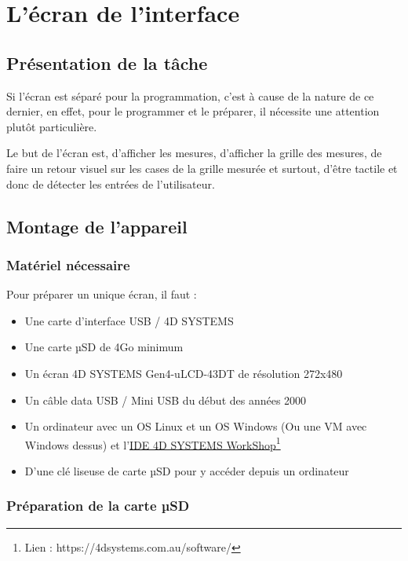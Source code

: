 \documentclass[11pt]{article}
\begin{document}
\newpage

\section{L'écran de l'interface}

\subsection{Présentation de la tâche}

Si l'écran est séparé pour la programmation, c'est à cause de la nature de ce dernier, en effet, pour le programmer et le préparer, il nécessite une attention plutôt particulière.

Le but de l'écran est, d'afficher les mesures, d'afficher la grille des mesures, de faire un retour visuel sur les cases de la grille mesurée et surtout, d'être tactile et donc de détecter les entrées de l'utilisateur.

\subsection{Montage de l'appareil}

\subsubsection{Matériel nécessaire}

Pour préparer un unique écran, il faut :

\begin{itemize}
	\item Une carte d'interface USB / 4D SYSTEMS
	\item Une carte µSD de 4Go minimum
	\item Un écran 4D SYSTEMS Gen4-uLCD-43DT de résolution 272x480
	\item Un câble data USB / Mini USB du début des années 2000
	\item Un ordinateur avec un OS Linux et un OS Windows (Ou une VM avec Windows dessus) et l'\href{https://4dsystems.com.au/software/}{IDE 4D SYSTEMS WorkShop}\footnote{Lien : https://4dsystems.com.au/software/}
	\item D'une clé liseuse de carte µSD pour y accéder depuis un ordinateur
\end{itemize}

\newpage

\subsubsection{Préparation de la carte µSD}
\end{document}
